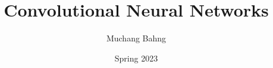 \documentclass{article}
\begin{document}

\title{Convolutional Neural Networks}
\author{Muchang Bahng}
\date{Spring 2023}

\maketitle
\tableofcontents
\pagebreak 


 
 
 
 
 
 
 
 



\end{document}
